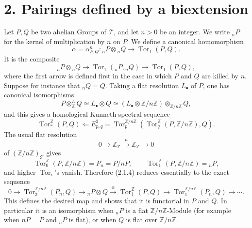 \documentclass[11pt]{article}
\providecommand{\Torop}{\operatorname{Tor}}
\providecommand{\cT}{\mathcal T}
\begin{document}
\section*{2. Pairings defined by a biextension}

Let \(P,Q\) be two abelian Groups of \(\cT\), and let \(n>0\) be an integer.  We write \({}_nP\) for the kernel of multiplication by \(n\) on \(P\).  We define a canonical homomorphism
\begin{equation}\tag{2.1.1}
        \alpha=\alpha^n_{P,Q}:{}_nP\otimes{}_nQ\longrightarrow \Torop_1(P,Q).
\end{equation}
It is the composite
\begin{equation}\tag{2.1.2}
        {}_nP\otimes{}_nQ
        \longrightarrow \Torop_1({}_nP,{}_{n}Q)
        \longrightarrow \Torop_1(P,Q),
\end{equation}
where the first arrow is defined first in the case in which \(P\) and \(Q\) are killed by \(n\).  Suppose for instance that \({}_nQ=Q\).  Taking a flat resolution \(L_\bullet\) of \(P\), one has canonical isomorphisms
\[
        P\otimes^L_{\mathbb Z}Q
        \simeq L_\bullet\otimes Q
        \simeq (L_\bullet\otimes \mathbb Z/n\mathbb Z)\otimes_{\mathbb Z/n\mathbb Z}Q,
\]
and this gives a homological Kunneth spectral sequence
\begin{equation}\tag{2.1.4}
        \Torop_*^{\mathbb Z}(P,Q)
        \Longleftarrow
        E^2_{p,q}=\Torop_p^{\mathbb Z/n\mathbb Z}
        (\Torop_q^{\mathbb Z}(P,\mathbb Z/n\mathbb Z),Q).
\end{equation}
The usual flat resolution
\[
        0\longrightarrow\mathbb Z_\cT\xrightarrow{n}\mathbb Z_\cT\longrightarrow0
\]
of \((\mathbb Z/n\mathbb Z)_\cT\) gives
\[
        \Torop_0^{\mathbb Z}(P,\mathbb Z/n\mathbb Z)=P_n=P/nP,
        \qquad
        \Torop_1^{\mathbb Z}(P,\mathbb Z/n\mathbb Z)={}_nP,
\]
and higher \(\Torop_i\)'s vanish.  Therefore (2.1.4) reduces essentially to the exact sequence
\begin{equation}\tag{2.1.5}
0\to \Torop_2^{\mathbb Z/n\mathbb Z}(P_n,Q)\to {}_nP\otimes Q
\xrightarrow{\alpha}\Torop_1^{\mathbb Z}(P,Q)\to\Torop_1^{\mathbb Z/n\mathbb Z}(P_n,Q)\to\cdots .
\end{equation}
This defines the desired map and shows that it is functorial in \(P\) and \(Q\).  In particular it is an isomorphism when \({}_nP\) is a flat \(\mathbb Z/n\mathbb Z\)-Module (for example when \(nP=P\) and \({}_nP\) is flat), or when \(Q\) is flat over \(\mathbb Z/n\mathbb Z\).
\end{document}
